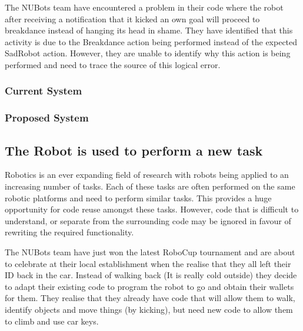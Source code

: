 \documentclass[english,12pt]{scrartcl}
\begin{document}
            The NUBots team have encountered a problem in their code where the robot after
            receiving a notification that it kicked an own goal will proceed to breakdance instead
            of hanging its head in shame. They have identified that this activity is due to the
            Breakdance action being performed instead of the expected SadRobot action. However, they
            are unable to identify why this action is being performed and need to trace the source
            of this logical error.
    
            \subsubsection{Current System}
            \subsubsection{Proposed System}
            
        \subsection{The Robot is used to perform a new task}
            Robotics is an ever expanding field of research with robots being applied to an
            increasing number of tasks. Each of these tasks are often performed on the same robotic
            platforms and need to perform similar tasks. This provides a huge opportunity for code
            reuse amongst these tasks. However, code that is difficult to understand, or separate
            from the surrounding code may be ignored in favour of rewriting the required
            functionality.
            
            The NUBots team have just won the latest RoboCup tournament and are about to celebrate
            at their local establishment when the realise that they all left their ID back in the
            car. Instead of walking back (It is really cold outside) they decide to adapt
            their existing code to program the robot to go and obtain their wallets for them. They
            realise that they already have code that will allow them to walk, identify objects and
            move things (by kicking), but need new code to allow them to climb and use car keys.
            
\end{document}

